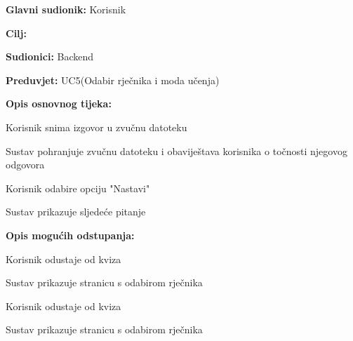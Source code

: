					\noindent {}
					\begin{packed_item}
						
						\item \textbf{Glavni sudionik: } Korisnik
						\item  \textbf{Cilj:} 
						\item  \textbf{Sudionici:} Backend
						\item  \textbf{Preduvjet:} UC5(Odabir rječnika i moda učenja)
						\item  \textbf{Opis osnovnog tijeka:}
						
						\item[] \begin{packed_enum}
							
							\item Korisnik snima izgovor u zvučnu datoteku
							\item Sustav pohranjuje zvučnu datoteku i obaviještava korisnika o točnosti njegovog odgovora
							\item Korisnik odabire opciju "Nastavi"
							\item Sustav prikazuje sljedeće pitanje
						\end{packed_enum}
						
						\item  \textbf{Opis mogućih odstupanja:}
						
						\item[] \begin{packed_item}
							
							\item[3.a] Korisnik odustaje od kviza
							\item[] \begin{packed_enum}
								
								\item Sustav prikazuje stranicu s odabirom rječnika
								
							\end{packed_enum}
							
							\item[4.a] Korisnik odustaje od kviza 
							\item[] \begin{packed_enum}
								
								\item Sustav prikazuje stranicu s odabirom rječnika
								
							\end{packed_enum}
							
						\end{packed_item}
					\end{packed_item}
					
